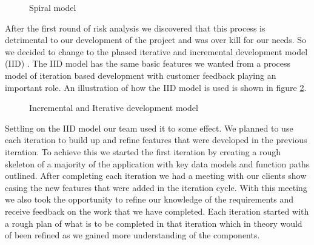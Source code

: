 \documentclass{style/CRPITStyle}
\renewcommand{\cite}{\citep}
\begin{document}
\begin{figure}[htb]
\caption{\protect\label{spiral-model} Spiral model }
\end{figure}

\vspace{.1in}

After the first round of risk analysis we discovered that this process is
detrimental to our development of the project and was over kill for our
needs. So we decided to change to the phased iterative and incremental
development model (IID) \cite{larman:2003:iid}. The IID model has the same basic features we wanted
from a process model of iteration based development with customer feedback
playing an important role. An illustration of how the IID model is used is shown
in figure \ref{iid-model}.

\vspace{.1in}

\begin{figure}[htb]
\caption{\protect\label{iid-model} Incremental and Iterative development model }
\end{figure}

\vspace{.1in}

Settling on the IID model our team used it to some effect.
We planned to use each iteration to build up and refine features that were
developed in the previous iteration. To achieve this we started the first
iteration by creating a rough skeleton of a majority of the application with key
data models and function paths outlined.
After completing each iteration we had a meeting with our clients show casing the
new features that were added in the iteration cycle. With this meeting we also
took the opportunity to refine our knowledge of the requirements and receive
feedback on the work that we have completed.
Each iteration started with a rough plan of what is to be completed in that
iteration which in theory would of been refined as we gained more understanding
of the components.
\end{document}
